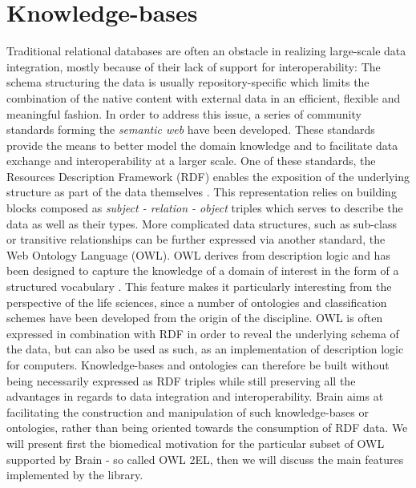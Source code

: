 \documentclass{bioinfo}
\begin{document}
\section{Knowledge-bases}
Traditional relational databases are often an obstacle in realizing large-scale data integration, 
mostly because of their lack of support for 
interoperability: The schema structuring the data is usually repository-specific which limits the combination of the 
native content with external data in an efficient, flexible and meaningful fashion. 
In order to address this issue, 
a series of community standards forming the \emph{semantic web} have been developed. These standards provide the means to better model
the domain knowledge and to facilitate data exchange and interoperability at a larger scale.
One of these standards, the Resources Description 
Framework (RDF) enables the exposition of the underlying structure as part of the data themselves \citep{FrankManola}.
This representation relies on building blocks composed as
\emph{subject - relation - object} triples which serves to describe the data as well as their types.
More complicated data structures, such as sub-class or
transitive relationships can be further expressed via another standard, the Web Ontology Language (OWL). OWL derives from description logic and
has been designed to capture the knowledge of a domain of interest in the form of a structured vocabulary \citep{W3COWLWorkingGroup}. 
This feature makes it particularly 
interesting from the perspective of the life sciences, since a number of ontologies and classification schemes
have been developed from the origin of 
the discipline. OWL is often expressed in combination with RDF in order to reveal the underlying schema of the data, but 
can also be used as such, as an implementation of description logic for computers. 
Knowledge-bases and ontologies can therefore be built without being necessarily expressed as RDF triples while still preserving all the 
advantages in regards to data integration and interoperability.
Brain aims at facilitating the construction and manipulation of 
such knowledge-bases or ontologies, rather than being oriented towards the consumption of RDF data. 
We will present first the biomedical motivation for the particular subset of OWL supported by Brain - so called OWL 2EL, 
then we will discuss the main features implemented by the library.
\end{document}
